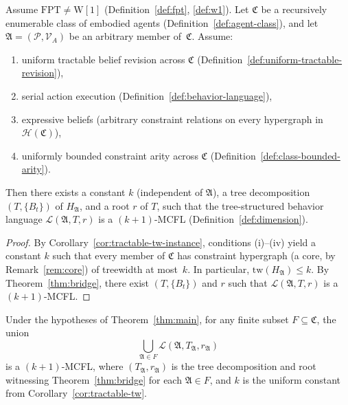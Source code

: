 \documentclass[runningheads]{llncs}
\begin{document}
\begin{theorem}\label{thm:main}
Assume $\mathrm{FPT} \neq \mathrm{W}[1]$ (Definition~\ref{def:fpt}, \ref{def:w1}).
Let $\mathfrak{C}$ be a recursively enumerable class of embodied agents (Definition~\ref{def:agent-class}), and let $\mathfrak{A} = (\mathcal{P}, \mathcal{V}_A)$ be an arbitrary member of~$\mathfrak{C}$.
Assume:
\begin{enumerate}[nosep,label=(\roman*)]
  \item uniform tractable belief revision across $\mathfrak{C}$ (Definition~\ref{def:uniform-tractable-revision}),
  \item serial action execution (Definition~\ref{def:behavior-language}),
  \item expressive beliefs (arbitrary constraint relations on every hypergraph in $\mathcal{H}(\mathfrak{C})$),
  \item uniformly bounded constraint arity across $\mathfrak{C}$ (Definition~\ref{def:class-bounded-arity}).
\end{enumerate}
Then there exists a constant $k$ (independent of $\mathfrak{A}$), a tree decomposition $(T, \{B_t\})$ of $H_{\mathfrak{A}}$, and a root $r$ of $T$, such that the tree-structured behavior language $\mathcal{L}(\mathfrak{A}, T, r)$ is a $(k{+}1)$-MCFL (Definition~\ref{def:dimension}).
\end{theorem}

\begin{proof}
By Corollary~\ref{cor:tractable-tw-instance}, conditions (i)--(iv) yield a constant $k$ such that every member of $\mathfrak{C}$ has constraint hypergraph (a core, by Remark~\ref{rem:core}) of treewidth at most~$k$.
In particular, $\mathrm{tw}(H_{\mathfrak{A}}) \leq k$.
By Theorem~\ref{thm:bridge}, there exist $(T, \{B_t\})$ and $r$ such that $\mathcal{L}(\mathfrak{A}, T, r)$ is a $(k{+}1)$-MCFL.
\end{proof}

\begin{theorem}\label{thm:main-finite}
Under the hypotheses of Theorem~\ref{thm:main}, for any finite subset $F \subseteq \mathfrak{C}$, the union
\[
  \bigcup_{\mathfrak{A} \in F} \mathcal{L}(\mathfrak{A}, T_{\mathfrak{A}}, r_{\mathfrak{A}})
\]
is a $(k{+}1)$-MCFL, where $(T_{\mathfrak{A}}, r_{\mathfrak{A}})$ is the tree decomposition and root witnessing Theorem~\ref{thm:bridge} for each $\mathfrak{A} \in F$, and $k$ is the uniform constant from Corollary~\ref{cor:tractable-tw}.
\end{theorem}
\end{document}
